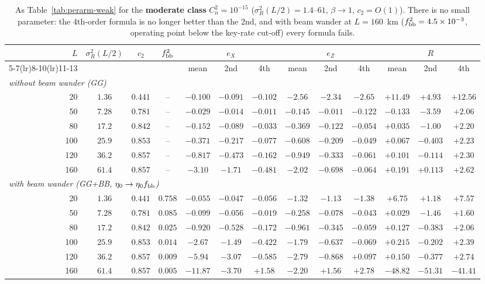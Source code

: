 \documentclass[11pt,a4paper]{article}
\theoremstyle{plain}
\theoremstyle{remark}
\begin{document}
\begin{table}[htbp]
\centering\scriptsize
\caption{As Table~\ref{tab:perarm-weak} for the \textbf{moderate class} $C_n^2=10^{-15}$ ($\sigma_R^2(L/2)=1.4$--$61$, $\beta\to1$, $c_2=O(1)$). There is no small parameter: the 4th-order formula is no longer better than the 2nd, and with beam wander at $L=160$~km ($f_{\rm bb}^2=4.5\times10^{-3}$, operating point below the key-rate cut-off) every formula fails.}
\label{tab:perarm-mod}
\begin{tabular}{rcccccccccccc}
\toprule
$L$ & $\sigma_R^2(L/2)$ & $c_2$ & $f_{\rm bb}^2$ & \multicolumn{3}{c}{$e_X$} & \multicolumn{3}{c}{$e_Z$} & \multicolumn{3}{c}{$R$}\\
\cmidrule(lr){5-7}\cmidrule(lr){8-10}\cmidrule(lr){11-13}
 & & & & mean & 2nd & 4th & mean & 2nd & 4th & mean & 2nd & 4th\\
\midrule
\multicolumn{13}{l}{\emph{without beam wander (GG)}} \\
20 & $1.36$ & $0.441$ & -- & $-0.100$ & $-0.091$ & $-0.102$ & $-2.56$ & $-2.34$ & $-2.65$ & $+11.49$ & $+4.93$ & $+12.56$ \\
50 & $7.28$ & $0.781$ & -- & $-0.029$ & $-0.014$ & $-0.011$ & $-0.145$ & $-0.011$ & $-0.122$ & $-0.133$ & $-3.59$ & $+2.06$ \\
80 & $17.2$ & $0.842$ & -- & $-0.152$ & $-0.089$ & $-0.033$ & $-0.369$ & $-0.122$ & $-0.054$ & $+0.035$ & $-1.00$ & $+2.20$ \\
100 & $25.9$ & $0.853$ & -- & $-0.371$ & $-0.217$ & $-0.077$ & $-0.608$ & $-0.209$ & $-0.049$ & $+0.067$ & $-0.403$ & $+2.23$ \\
120 & $36.2$ & $0.857$ & -- & $-0.817$ & $-0.473$ & $-0.162$ & $-0.949$ & $-0.333$ & $-0.061$ & $+0.101$ & $-0.114$ & $+2.30$ \\
160 & $61.4$ & $0.857$ & -- & $-3.10$ & $-1.71$ & $-0.481$ & $-2.02$ & $-0.698$ & $-0.064$ & $+0.191$ & $+0.113$ & $+2.62$ \\
\midrule
\multicolumn{13}{l}{\emph{with beam wander (GG+BB, $\eta_0\to\eta_0f_{\rm bb}$)}} \\
20 & $1.36$ & $0.441$ & $0.758$ & $-0.055$ & $-0.047$ & $-0.056$ & $-1.32$ & $-1.13$ & $-1.38$ & $+6.75$ & $+1.18$ & $+7.57$ \\
50 & $7.28$ & $0.781$ & $0.085$ & $-0.099$ & $-0.056$ & $-0.019$ & $-0.258$ & $-0.078$ & $-0.043$ & $+0.029$ & $-1.46$ & $+1.60$ \\
80 & $17.2$ & $0.842$ & $0.025$ & $-0.920$ & $-0.528$ & $-0.172$ & $-0.961$ & $-0.345$ & $-0.059$ & $+0.127$ & $-0.383$ & $+2.06$ \\
100 & $25.9$ & $0.853$ & $0.014$ & $-2.67$ & $-1.49$ & $-0.422$ & $-1.79$ & $-0.637$ & $-0.069$ & $+0.215$ & $-0.202$ & $+2.39$ \\
120 & $36.2$ & $0.857$ & $0.009$ & $-5.94$ & $-3.07$ & $-0.585$ & $-2.79$ & $-0.868$ & $+0.097$ & $+0.150$ & $-0.377$ & $+2.74$ \\
160 & $61.4$ & $0.857$ & $0.005$ & $-11.87$ & $-3.70$ & $+1.58$ & $-2.20$ & $+1.56$ & $+2.78$ & $-48.82$ & $-51.31$ & $-41.41$ \\


\end{tabular}
\end{table}
\end{document}
